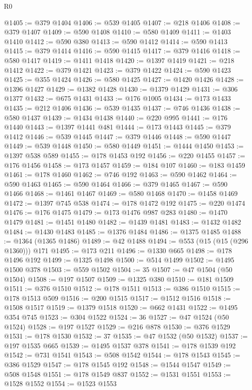 \begin{lexlean}{R0}
\begin{coremodule}
@1405 := @379 @1404
@1406 := @539 @1405
@1407 := @218 @1406
@1408 := @379 @1407
@1409 := @590 @1408
@1410 := @580 @1409
@1411 := @1403 @1410
@1412 := @590 @380
@1413 := @590 @1412
@1414 := @590 @1413
@1415 := @379 @1414
@1416 := @590 @1415
@1417 := @379 @1416
@1418 := @580 @1417
@1419 := @1411 @1418
@1420 := @1397 @1419
@1421 := @218 @1412
@1422 := @379 @1421
@1423 := @379 @1422
@1424 := @590 @1423
@1425 := @355 @1424
@1426 := @580 @1425
@1427 := @1420 @1426
@1428 := @1396 @1427
@1429 := @1382 @1428
@1430 := @1379 @1429
@1431 := @306 @1377
@1432 := @675 @1431
@1433 := @176 @1005
@1434 := @173 @1433
@1435 := @212 @1406
@1436 := @539 @1435
@1437 := @746 @1436
@1438 := @580 @1437
@1439 := @1434 @1438
@1440 := @220 @995
@1441 := @176 @1440
@1443 := @1397 @1441 @481
@1444 := @173 @1443
@1445 := @379 @1412
@1446 := @539 @1445
@1447 := @379 @1446
@1448 := @590 @1447
@1449 := @539 @1448
@1450 := @580 @1449
@1451 := @1444 @1450
@1453 := @1397 @538 @589
@1455 := @178 @1453 @192
@1456 := @220 @1455
@1457 := @176 @1456
@1458 := @173 @1457
@1459 := @184 @107
@1460 := @183 @1459
@1461 := @178 @1460
@1462 := @746 @192
@1463 := @590 @1462
@1464 := @590 @1463
@1465 := @590 @1464
@1466 := @379 @1465
@1467 := @590 @1466
@1468 := @1461 @1467
@1469 := @580 @1468
@1470 := @1458 @1469
@1472 := @1397 @745 @538
@1474 := @178 @1472 @192
@1475 := @220 @1474
@1476 := @176 @1475
@1479 := @173 @1476 @987 @283
@1480 := @1470 @1479
@1481 := @1451 @1480
@1482 := @1439 @1481
@1483 := @1432 @1482
@1484 := @1430 @1483
@1485 := @1376 @1484
@1486 := @1375 @1485
@1488 := @1364 (@1365 @1486)
@1489 := @42 @1488
@1494 := @553 (@15 (@15 (@296 @1360))) @171
@1495 := @173 @211
@1496 := @1330 @665
@1498 := @178 @1496 @192
@1499 := @1325 @1498
@1500 := @514 @1499
@1502 := @1495 @1500 @378
@1503 := @559 @1502
@1504 := 35
@1507 := @47 @1504 (@50 @1504)
@1508 := @197 @1507
@1509 := @1325 @380
@1510 := @181 @1509
@1511 := @376 @1510
@1512 := @178 @1511
@1513 := @386 @1510
@1515 := @178 @1513 @509
@1516 := @200 @1515
@1517 := @1512 @1516
@1518 := @1508 @1517
@1519 := @1379 @1518
@1520 := @662 @1431
@1522 := @1495 @354 @745
@1523 := @304 @1522
@1524 := 36
@1527 := @47 @1524 (@50 @1524)
@1528 := @197 @1527
@1529 := @216 @878
@1530 := @376 @1529
@1531 := @178 @1530
@1532 := 37
@1535 := @47 @1532 (@50 @1532)
@1537 := @197 @1535 @665
@1539 := @1495 @1537 @378
@1541 := @178 @1539 @192
@1542 := @731 @1541
@1543 := @508 @1542
@1544 := @178 @1543
@1545 := @386 @1529
@1547 := @178 @1545 @192
@1548 := @1544 @1547
@1549 := @508 @1548
@1551 := @178 @1549 @837
@1552 := @1531 @1551
@1553 := @1528 @1552
@1554 := @1523 @1553

\end{coremodule}
\end{lexlean}
